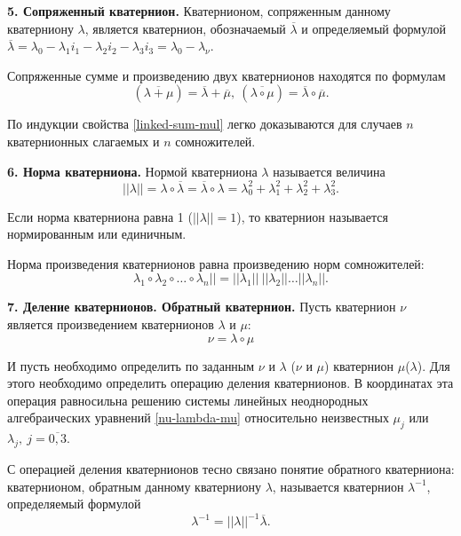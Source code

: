 \documentclass[14pt]{extreport}
\begin{document}
\textbf{5. Сопряженный кватернион.} Кватернионом, сопряженным данному кватерниону $\lambda$, является кватернион, обозначаемый $\overline{\lambda}$ и определяемый формулой $\overline{\lambda}=\lambda_{0}-\lambda_{1}i_{1}-\lambda_{2}i_{2}-\lambda_{3}i_{3}=\lambda_{0}-\lambda_{\nu}$.

Сопряженные сумме и произведению двух кватернионов находятся
по формулам
\begin{equation}
\label{linked-sum-mul}
(\overline{\lambda+\mu})=\overline{\lambda}+\overline{\mu},\ (\overline{\lambda\circ\mu})=\overline{\lambda}\circ\overline{\mu}.
\end{equation}

По индукции свойства \eqref{linked-sum-mul} легко доказываются для случаев $n$ кватернионных слагаемых и $n$ сомножителей.

\textbf{6. Норма кватерниона.} Нормой кватерниона $\lambda$ называется величина 
\begin{equation}
||\lambda|| = \lambda \circ \overline{\lambda} = \overline{\lambda} \circ \lambda = \lambda_{0}^{2}+\lambda_{1}^{2}+\lambda_{2}^{2}+\lambda_{3}^{2}.
\end{equation}

Если норма кватерниона равна 1 ($||\lambda|| = 1$), то кватернион называется нормированным или единичным.

Норма произведения кватернионов равна произведению норм сомножителей: 
\begin{equation}
\lambda_{1} \circ \lambda_{2} \circ \dots \circ \lambda_{n}|| = ||\lambda_{1}||\ ||\lambda_{2}|| \dots ||\lambda_{n}||.
\end{equation}

\textbf{7. Деление кватернионов. Обратный кватернион.} Пусть кватернион $\nu$ является произведением кватернионов $\lambda$ и $\mu$:
\begin{equation}
\label{res-nu-mul-lambda-mu}
\nu=\lambda \circ \mu
\end{equation}

И пусть необходимо определить по заданным $\nu$ и $\lambda$ ($\nu$ и $\mu$) кватернион $\mu$($\lambda$). Для этого необходимо определить операцию деления кватернионов. В координатах эта операция равносильна решению системы линейных неоднородных алгебраических уравнений \eqref{nu-lambda-mu} относительно неизвестных $\mu_{j}$ или $\lambda_{j},\ j=\overline{0,3}.$

С операцией деления кватернионов тесно связано понятие обратного кватерниона: кватернионом, обратным данному кватерниону $\lambda$, называется кватернион $\lambda^{-1}$, определяемый формулой
\begin{equation}
\lambda^{-1}=||\lambda||^{-1}\overline{\lambda}.
\end{equation}
\end{document}
